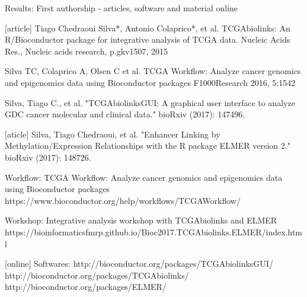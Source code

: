 \documentclass[slidestop,compress,11pt,xcolor=dvipsnames]{beamer}
\begin{document}
\begin{frame}{Results: First authorship - articles, software and material online}
\begin{thebibliography}{10}
\tiny
{}[article]
Tiago Chedraoui Silva*, Antonio Colaprico*, et al.
\newblock TCGAbiolinks: An R/Bioconductor package for integrative analysis of TCGA data. Nucleic Acids Res.,
\newblock Nucleic acids research, p.gkv1507, 2015

\beamertemplatearticlebibitems
{}
Silva TC, Colaprico A, Olsen C et al.
\newblock TCGA Workflow: Analyze cancer genomics and epigenomics data using Bioconductor packages
\newblock  F1000Research 2016, 5:1542

\beamertemplatearticlebibitems
{}
Silva, Tiago C., et al.
\newblock "TCGAbiolinksGUI: A graphical user interface to analyze GDC cancer molecular and clinical data."
\newblock bioRxiv (2017): 147496.

[aticle]
Silva, Tiago Chedraoui, et al.
\newblock "Enhancer Linking by Methylation/Expression Relationships with the R package ELMER version 2."
\newblock  bioRxiv (2017): 148726.

\beamertemplateonlinebibitems
{}
Workflow:
\newblock TCGA Workflow: Analyze cancer genomics and epigenomics data using Bioconductor packages\\
 https://www.bioconductor.org/help/workflows/TCGAWorkflow/

\beamertemplateonlinebibitems
{}
Workshop:
\newblock Integrative analysis workshop with TCGAbiolinks and ELMER\\ https://bioinformaticsfmrp.github.io/Bioc2017.TCGAbiolinks.ELMER/index.html

[online]
  Softwares:
  \newblock http://bioconductor.org/packages/TCGAbiolinksGUI/\\ http://bioconductor.org/packages/TCGAbiolinks/\\ http://bioconductor.org/packages/ELMER/


 \end{thebibliography}
\end{frame}
\end{document}
